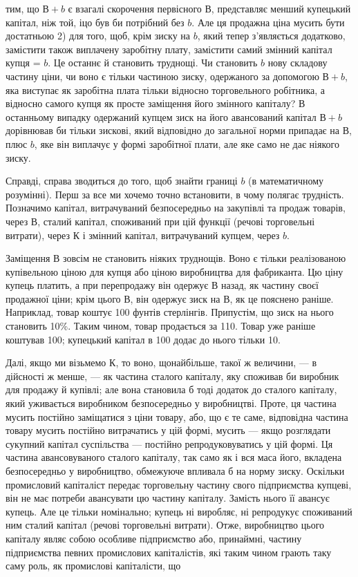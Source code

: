 \parcont{}  %
тим, що $В + b$ є взагалі скорочення первісного $В$, представляє
менший купецький капітал, ніж той, іцо був би потрібний без $b$.
Але ця продажна ціна мусить бути достатньою 2) для того, щоб,
крім зиску на $b$, який тепер з’являється додатково, замістити також
виплачену заробітну плату, замістити самий змінний капітал
купця = $b$. Це останнє й становить труднощі. Чи становить $b$
нову складову частину ціни, чи воно є тільки частиною зиску,
одержаного за допомогою $В + b$, яка виступає як заробітна плата
тільки відносно торговельного робітника, а відносно самого
купця як просте заміщення його змінного капіталу? В останньому
випадку одержаний купцем зиск на його авансований капітал
$В + b$ дорівнював би тільки зискові, який відповідно до загальної
норми припадає на $В$, плюс $b$, яке він виплачує у формі
заробітної плати, але яке само не дає ніякого зиску.

Справді, справа зводиться до того, щоб знайти границі $b$ (в математичному
розумінні). Перш за все ми хочемо точно встановити,
в чому полягає трудність. Позначимо капітал, витрачуваний безпосередньо
на закупівлі та продаж товарів, через $В$, сталий капітал,
споживаний при цій функції (речові торговельні витрати),
через $К$ і змінний капітал, витрачуваний купцем, через $b$.

Заміщення $В$ зовсім не становить ніяких труднощів. Воно є
тільки реалізованою купівельною ціною для купця або ціною
виробництва для фабриканта. Цю ціну купець платить, а при
перепродажу він одержує $В$ назад, як частину своєї продажної
ціни; крім цього $В$, він одержує зиск на $В$, як це пояснено раніше.
Наприклад, товар коштує 100 фунтів стерлінгів. Припустім, що зиск
на нього становить 10\%. Таким чином, товар продається за
110. Товар уже раніше коштував 100; купецький капітал в 100
додає до нього тільки 10.

Далі, якщо ми візьмемо $К$, то воно, щонайбільше, такої ж
величини, — в дійсності ж менше, — як частина сталого капіталу,
яку споживав би виробник для продажу й купівлі; але вона становила
б тоді додаток до сталого капіталу, який уживається виробником
безпосередньо у виробництві. Проте, ця частина мусить
постійно заміщатися з ціни товару, або, що є те саме, відповідна
частина товару мусить постійно витрачатись у цій формі, мусить
— якщо розглядати сукупний капітал суспільства — постійно
репродуковуватись у цій формі. Ця частина авансовуваного сталого
капіталу, так само як і вся маса його, вкладена безпосередньо
у виробництво, обмежуюче впливала б на норму зиску. Оскільки
промисловий капіталіст передає торговельну частину свого підприємства
купцеві, він не має потреби авансувати цю частину
капіталу. Замість нього її авансує купець. Але це тільки номінально;
купець ні виробляє, ні репродукує споживаний ним сталий
капітал (речові торговельні витрати). Отже, виробництво
цього капіталу являє собою особливе підприємство або, принаймні,
частину підприємства певних промислових капіталістів, які таким
чином грають таку саму роль, як промислові капіталісти, що
\parbreak{}  %
